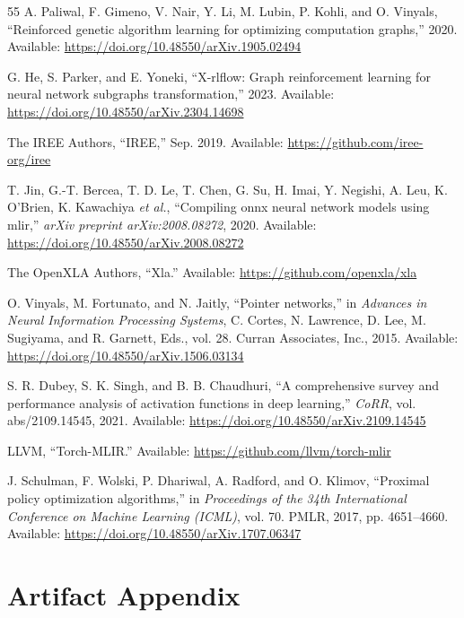 \documentclass[10pt,twocolumn]{article}
\begin{document}
\begin{thebibliography}{55}
 A. Paliwal, F. Gimeno, V. Nair, Y. Li, M. Lubin, P. Kohli, and O. Vinyals, ``Reinforced genetic algorithm learning for optimizing computation graphs,'' 2020. Available: \url{https://doi.org/10.48550/arXiv.1905.02494}

 G. He, S. Parker, and E. Yoneki, ``X-rlflow: Graph reinforcement learning for neural network subgraphs transformation,'' 2023. Available: \url{https://doi.org/10.48550/arXiv.2304.14698}

 The IREE Authors, ``IREE,'' Sep. 2019. Available: \url{https://github.com/iree-org/iree}

 T. Jin, G.-T. Bercea, T. D. Le, T. Chen, G. Su, H. Imai, Y. Negishi, A. Leu, K. O'Brien, K. Kawachiya \emph{et al.}, ``Compiling onnx neural network models using mlir,'' \emph{arXiv preprint arXiv:2008.08272}, 2020. Available: \url{https://doi.org/10.48550/arXiv.2008.08272}

 The OpenXLA Authors, ``Xla.'' Available: \url{https://github.com/openxla/xla}

 O. Vinyals, M. Fortunato, and N. Jaitly, ``Pointer networks,'' in \emph{Advances in Neural Information Processing Systems}, C. Cortes, N. Lawrence, D. Lee, M. Sugiyama, and R. Garnett, Eds., vol. 28. Curran Associates, Inc., 2015. Available: \url{https://doi.org/10.48550/arXiv.1506.03134}

 S. R. Dubey, S. K. Singh, and B. B. Chaudhuri, ``A comprehensive survey and performance analysis of activation functions in deep learning,'' \emph{CoRR}, vol. abs/2109.14545, 2021. Available: \url{https://doi.org/10.48550/arXiv.2109.14545}

 LLVM, ``Torch-MLIR.'' Available: \url{https://github.com/llvm/torch-mlir}

 J. Schulman, F. Wolski, P. Dhariwal, A. Radford, and O. Klimov, ``Proximal policy optimization algorithms,'' in \emph{Proceedings of the 34th International Conference on Machine Learning (ICML)}, vol. 70. PMLR, 2017, pp. 4651--4660. Available: \url{https://doi.org/10.48550/arXiv.1707.06347}

\end{thebibliography}

\renewcommand{\thesection}{\Alph{section}}
\setcounter{section}{0}

\section{Artifact Appendix}
\end{document}
